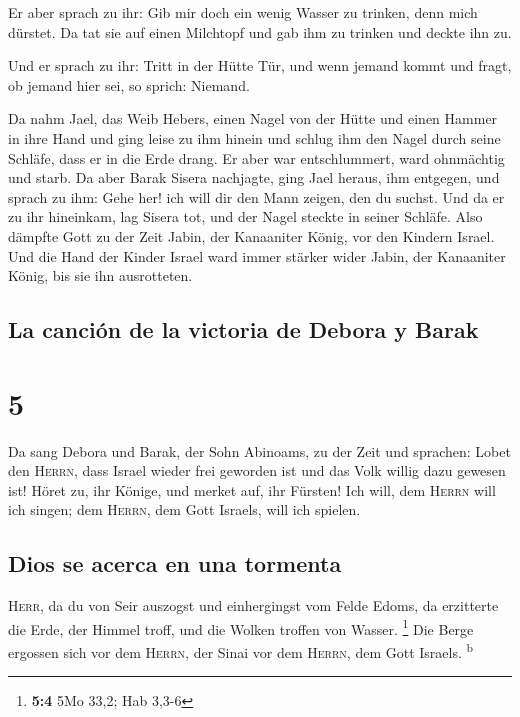  Er aber sprach zu ihr: Gib mir doch ein wenig Wasser zu
trinken, denn mich dürstet. Da tat sie auf einen Milchtopf und gab ihm
zu trinken und deckte ihn zu.

 Und er sprach zu ihr: Tritt in der Hütte Tür, und wenn
jemand kommt und fragt, ob jemand hier sei, so sprich: Niemand.

 Da nahm Jael, das Weib Hebers, einen Nagel von der Hütte
und einen Hammer in ihre Hand und ging leise zu ihm hinein und schlug
ihm den Nagel durch seine Schläfe, dass er in die Erde drang. Er aber
war entschlummert, ward ohnmächtig und starb.  Da aber
Barak Sisera nachjagte, ging Jael heraus, ihm entgegen, und sprach zu
ihm: Gehe her! ich will dir den Mann zeigen, den du suchst. Und da er zu
ihr hineinkam, lag Sisera tot, und der Nagel steckte in seiner Schläfe.
 Also dämpfte Gott zu der Zeit Jabin, der Kanaaniter
König, vor den Kindern Israel.  Und die Hand der Kinder
Israel ward immer stärker wider Jabin, der Kanaaniter König, bis sie ihn
ausrotteten.

\hypertarget{la-canciuxf3n-de-la-victoria-de-debora-y-barak}{%
\subsection{La canción de la victoria de Debora y
Barak}\label{la-canciuxf3n-de-la-victoria-de-debora-y-barak}}

\hypertarget{section-4}{%
\section{5}\label{section-4}}

 Da sang Debora und Barak, der Sohn Abinoams, zu der Zeit
und sprachen:  Lobet den \textsc{Herrn}, dass Israel
wieder frei geworden ist und das Volk willig dazu gewesen ist!
 Höret zu, ihr Könige, und merket auf, ihr Fürsten! Ich
will, dem \textsc{Herrn} will ich singen; dem \textsc{Herrn}, dem Gott
Israels, will ich spielen.

\hypertarget{dios-se-acerca-en-una-tormenta}{%
\subsection{Dios se acerca en una
tormenta}\label{dios-se-acerca-en-una-tormenta}}

 \textsc{Herr}, da du von Seir auszogst und einhergingst
vom Felde Edoms, da erzitterte die Erde, der Himmel troff, und die
Wolken troffen von Wasser. \footnote{\textbf{5:4} 5Mo 33,2; Hab 3,3-6}
 Die Berge ergossen sich vor dem \textsc{Herrn}, der Sinai
vor dem \textsc{Herrn}, dem Gott Israels. \textsuperscript{b}

